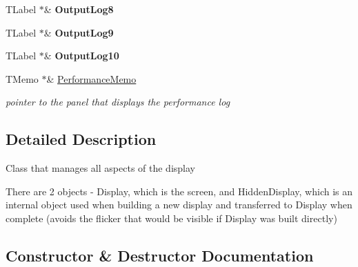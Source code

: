 \begin{DoxyCompactItemize}
\item 
\mbox{\label{class_t_display_a9de95aeb0787e6c535cf6622b3a87d8d}} 
T\+Label $\ast$\& {\bfseries Output\+Log8}
\item 
\mbox{\label{class_t_display_a5bf597b689a283f16b1aae5fe79ad2ec}} 
T\+Label $\ast$\& {\bfseries Output\+Log9}
\item 
\mbox{\label{class_t_display_afc194f2bc9eda7fe8de600098c85d2ac}} 
T\+Label $\ast$\& {\bfseries Output\+Log10}
\item 
\mbox{\label{class_t_display_a4ecb842151b8cb4a56a72ec72b9ca682}} 
T\+Memo $\ast$\& \mbox{\hyperlink{class_t_display_a4ecb842151b8cb4a56a72ec72b9ca682}{Performance\+Memo}}
\begin{DoxyCompactList}\small\item\em pointer to the panel that displays the performance log \end{DoxyCompactList}\end{DoxyCompactItemize}


\subsection{Detailed Description}
Class that manages all aspects of the display

There are 2 objects -\/ Display, which is the screen, and Hidden\+Display, which is an internal object used when building a new display and transferred to Display when complete (avoids the flicker that would be visible if Display was built directly) 

\subsection{Constructor \& Destructor Documentation}
\mbox{\label{class_t_display_a72cbdba53131a636da2c656f6025574b}} 
